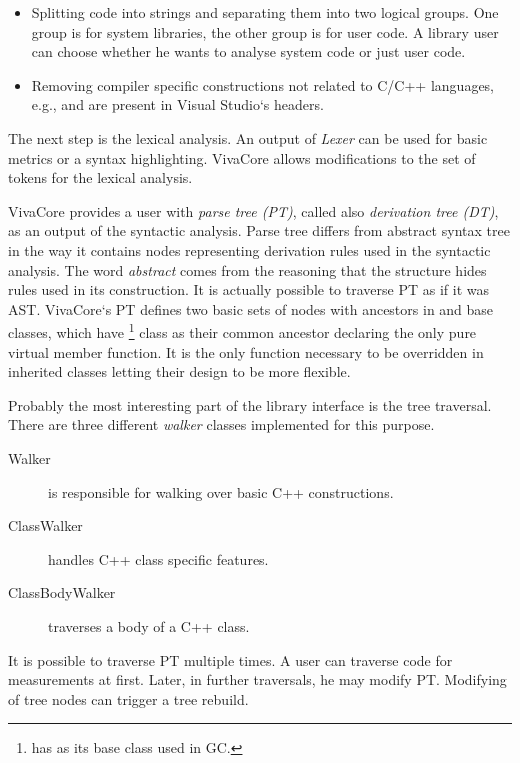 \begin{itemize}
\item Splitting code into strings and separating them into two logical groups. One group is for system libraries, the other group is for user code. A library user can choose whether he wants to analyse system code or just user code.
\item Removing compiler specific constructions not related to C/C++ languages, e.g.,  and  are present in Visual Studio`s headers.
\end{itemize}

The next step is the lexical analysis. An output of \emph{Lexer} can be used for basic metrics or a syntax highlighting. VivaCore allows modifications to the set of tokens for the lexical analysis.

VivaCore provides a user with \emph{parse tree (PT)}, called also \emph{derivation tree (DT)}, as an output of the syntactic analysis. Parse tree differs from abstract syntax tree in the way it contains nodes representing derivation rules used in the syntactic analysis. The word \emph{abstract} comes from the reasoning that the structure hides rules used in its construction. It is actually possible to traverse PT as if it was AST. VivaCore`s PT defines two basic sets of nodes with ancestors in  and  base classes, which have \footnote{ has  as its base class used in GC.} class as their common ancestor declaring the only pure virtual member function. It is the only function necessary to be overridden in inherited classes letting their design to be more flexible.

Probably the most interesting part of the library interface is the tree traversal. There are three different \emph{walker} classes implemented for this purpose.

\begin{description}
\item[Walker] is responsible for walking over basic C++ constructions.
\item[ClassWalker] handles C++ class specific features.
\item[ClassBodyWalker] traverses a body of a C++ class.
\end{description}

It is possible to traverse PT multiple times. A user can traverse code for measurements at first. Later, in further traversals, he may modify PT. Modifying of tree nodes can trigger a tree rebuild.

